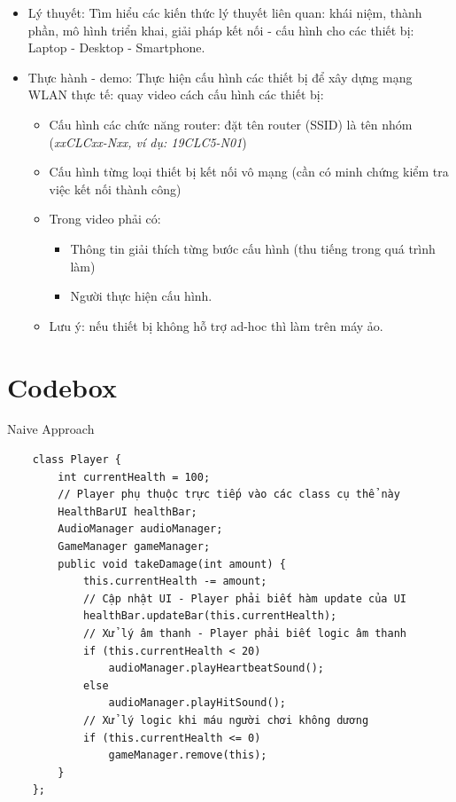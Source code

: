 \begin{itemize}[topsep=0pt, itemsep=2.5pt, leftmargin=1.5cm]
    \item Lý thuyết: Tìm hiểu các kiến thức lý thuyết liên quan: khái niệm, thành phần, mô hình triển khai, giải pháp kết nối - cấu hình cho các thiết bị: Laptop - Desktop - Smartphone.
    \item Thực hành - demo: Thực hiện cấu hình các thiết bị để xây dựng mạng WLAN thực tế: quay video cách cấu hình các thiết bị:

    \begin{itemize}[label=, leftmargin=1.5cm]
        \item Cấu hình các chức năng router: đặt tên router (SSID) là tên nhóm (\textit{xxCLCxx-Nxx, ví dụ: 19CLC5-N01})
        \item Cấu hình từng loại thiết bị kết nối vô mạng (cần có minh chứng kiểm tra việc kết nối thành công)
        \item Trong video phải có:

        \begin{itemize}[label=, leftmargin=1.5cm]
            \item Thông tin giải thích từng bước cấu hình (thu tiếng trong quá trình làm)
            \item Người thực hiện cấu hình.
        \end{itemize}
        \item Lưu ý: nếu thiết bị không hỗ trợ ad-hoc thì làm trên máy ảo.
    \end{itemize}
\end{itemize}

\newpage

\section{Codebox}

\begin{codebox}[naiveSolution]{Naive Approach}
    \begin{verbatim}
    class Player {
        int currentHealth = 100;
        // Player phụ thuộc trực tiếp vào các class cụ thể này
        HealthBarUI healthBar;
        AudioManager audioManager;
        GameManager gameManager;
        public void takeDamage(int amount) {
            this.currentHealth -= amount;
            // Cập nhật UI - Player phải biết hàm update của UI
            healthBar.updateBar(this.currentHealth);
            // Xử lý âm thanh - Player phải biết logic âm thanh
            if (this.currentHealth < 20)
                audioManager.playHeartbeatSound();
            else
                audioManager.playHitSound();
            // Xử lý logic khi máu người chơi không dương
            if (this.currentHealth <= 0)
                gameManager.remove(this);
        }
    };
    \end{verbatim}
\end{codebox}

